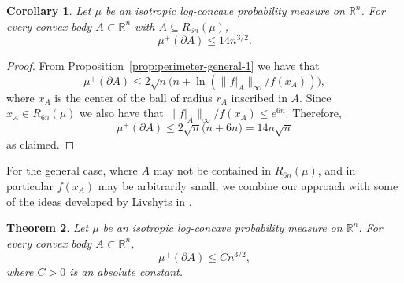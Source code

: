 \documentclass[11pt,leqno]{article}
\newtheorem{theorem}{Theorem}[section]
\newtheorem{corollary}[theorem]{Corollary}
\theoremstyle{remark}
\numberwithin{equation}{section}
\newcommand{\ls}{\leqslant}
\begin{document}
\begin{corollary}\label{cor:perimeter-subset-Rn}Let $\mu$ be an isotropic log-concave probability measure on $\mathbb{R}^n$. For every  
convex body $A\subset\mathbb{R}^n$ with $A\subseteq R_{6n}(\mu)$, 
$$\mu^+(\partial A)\ls 14n^{3/2}.$$
\end{corollary}

\begin{proof}From Proposition~\ref{prop:perimeter-general-1} we have that 
$$\mu^+(\partial A)\ls 2\sqrt{n}\big(n+\ln(\|f\big|_A\|_{\infty}/f(x_A))\big),$$
where $x_A$ is the center of the ball of radius $r_A$ inscribed in $A$. Since $x_A\in R_{6n}(\mu)$ we also have that $\|f\big|_A\|_{\infty}/f(x_A)\ls e^{6n}$. Therefore,
$$\mu^+(\partial A)\ls 2\sqrt{n}\big(n+6n\big)=14n\sqrt{n}$$
as claimed.
\end{proof}

For the general case, where $A$ may not be contained in $R_{6n}(\mu)$, and in particular $f(x_A)$ may be arbitrarily small, we combine our approach with some
of the ideas developed by Livshyts in \cite{Livshyts-2021}.

\begin{theorem}\label{th:perimeter}Let $\mu$ be an isotropic log-concave probability measure on $\mathbb{R}^n$. For every  
convex body $A\subset\mathbb{R}^n$, 
$$\mu^+(\partial A)\ls Cn^{3/2},$$
where $C>0$ is an absolute constant.
\end{theorem}
\end{document}
